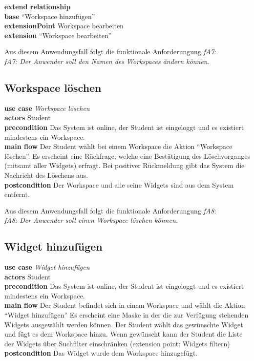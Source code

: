 \textbf{extend relationship}\\
\textbf{base} "`Workspace hinzufügen"'\\
\textbf{extensionPoint} Workspace bearbeiten\\
\textbf{extension} "`Workspace bearbeiten"'
 
Aus diesem Anwendungsfall folgt die funktionale Anforderungung \emph{fA7}:\\
\emph{fA7: Der Anwender soll den Namen des Workspaces ändern können.}\\
 
 \subsection{Workspace löschen}
\textbf{use case} \emph{Workspace löschen}\\
\textbf{actors} Student\\
\textbf{precondition} Das System ist online, der Student ist eingeloggt und es existiert mindestens ein Workspace.\\
\textbf{main flow} Der Student wählt bei einem Workspace die Aktion "`Workspace löschen"'. Es erscheint eine Rückfrage, welche eine Bestätigung des Löschvorganges (mitsamt aller Widgets) erfragt. Bei positiver Rückmeldung gibt das System die Nachricht des Löschens aus. \\
\textbf{postcondition} Der Workspace und alle seine Widgets sind aus dem System entfernt.
 
Aus diesem Anwendungsfall folgt die funktionale Anforderungung \emph{fA8}:\\
\emph{fA8: Der Anwender soll einen Workspace löschen können.}\\

\subsection{Widget hinzufügen}
\textbf{use case} \emph{Widget hinzufügen}\\
\textbf{actors} Student\\
\textbf{precondition} Das System ist online, der Student ist eingeloggt und es existiert mindestens ein Workspace.\\
\textbf{main flow} Der Student befindet sich in einem Workspace und wählt die Aktion "`Widget hinzufügen"' Es erscheint eine Maske in der die zur Verfügung stehenden Widgets ausgewählt werden können. Der Student wählt das gewünschte Widget und fügt es dem Workspace hinzu. Wenn gewünscht kann der Student die Liste der Widgets über Suchfilter einschränken (extension point: Widgets filtern)\\
\textbf{postcondition} Das Widget wurde dem Workspace hinzugefügt.
 
